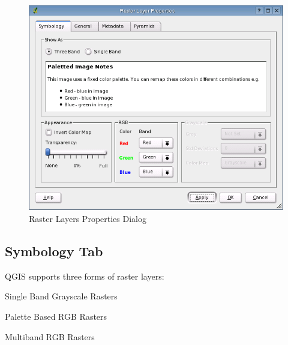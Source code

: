 \begin{figure}[h]
   \begin{center}
   \caption{Raster Layers Properties Dialog}\label{fig:raster_properties}\smallskip
   \includegraphics[scale=.7]{qgis_user_guide_images/raster_properties}
\end{center}  
\end{figure}


\subsection{Symbology Tab}


QGIS supports three forms of raster layers:
\begin{compactitem}
\item Single Band Grayscale Rasters
\item Palette Based RGB Rasters
\item Multiband RGB Rasters
\end{compactitem}

